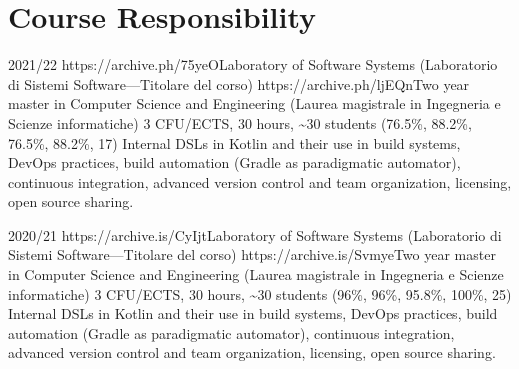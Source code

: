 \section{Course Responsibility}
\vspace{-2em}
\begin{outerlist}
    \item[2021/22]
        \unibocourse
        {https://archive.ph/75yeO}{Laboratory of Software Systems (Laboratorio di Sistemi Software---Titolare del corso)}
        {https://archive.ph/ljEQn}{Two year master in Computer Science and Engineering (Laurea magistrale in Ingegneria e Scienze informatiche)}
        {3 CFU/ECTS, 30 hours, \textasciitilde{}30 students}
        {(76.5\%, 88.2\%, 76.5\%, 88.2\%, 17)}
        {Internal DSLs in Kotlin and their use in build systems, DevOps practices, build automation (Gradle as paradigmatic automator), continuous integration, advanced version control and team organization, licensing, open source sharing.}
    \item[2020/21]
        \unibocourse
        {https://archive.is/CyIjt}{Laboratory of Software Systems (Laboratorio di Sistemi Software---Titolare del corso)}
        {https://archive.is/Svmye}{Two year master in Computer Science and Engineering (Laurea magistrale in Ingegneria e Scienze informatiche)}
        {3 CFU/ECTS, 30 hours, \textasciitilde{}30 students}
        {(96\%, 96\%, 95.8\%, 100\%, 25)}
        {Internal DSLs in Kotlin and their use in build systems, DevOps practices, build automation (Gradle as paradigmatic automator), continuous integration, advanced version control and team organization, licensing, open source sharing.}
\end{outerlist}

